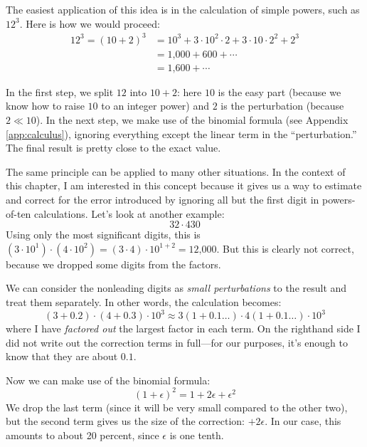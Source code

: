 The easiest application of this idea is in the calculation of simple
powers, such as $12^3$. Here is how we would proceed:
\begin{align*}
12^3 = (10+2)^3 & = 10^3 + 3 \cdot 10^2 \cdot 2 
                         + 3 \cdot 10 \cdot 2^2 + 2^3 \\
                & = \text{1,000} + 600 + \dotsb \\
                & = \text{1,600} + \dotsb
\end{align*}
    
In the first step, we split $12$ into $10 + 2$: here $10$ is the easy
part (because we know how to raise $10$ to an integer power) and $2$
is the perturbation (because $2 \ll 10$).  In the next step, we make
use of the binomial formula (see Appendix \ref{app:calculus}),
ignoring everything except the linear term in the ``perturbation.''
The final result is pretty close to the exact value.
    
The same principle can be applied to many other situations.  In the
context of this chapter, I am interested in this concept because  it
gives us a way to estimate and correct for the error introduced by
ignoring all but the first digit in powers-of-ten calculations.  Let's
look at another example:
%
\[
32 \cdot 430
\]
%
Using only the most significant digits, this is $(3 \cdot 10^1) \cdot
(4 \cdot 10^2) = (3 \cdot 4) \cdot 10^{1 + 2} = \text{12,000}$. But
this is clearly not correct, because we dropped some digits from the
factors.

We can consider the nonleading digits as \emph{small perturbations} to
the result and treat them separately. In other words, the calculation
becomes:
% 
\[ (3 + 0.2) \cdot (4 + 0.3) \cdot 10^3 
\approx 3 (1 + 0.1\dotsc) \cdot 4 (1+0.1\dotsc) \cdot 10^3 
\] 
% 
where I have \emph{factored out} the largest factor in each term. On
the righthand side I did not write out the correction terms in
full---for our purposes, it's enough to know that they are about $0.1$.
    
    
Now we can make use of the binomial formula:
%
\[
(1 + \epsilon)^2 = 1 + 2 \epsilon + \epsilon^2
\]
%
We drop the last term (since it will be very small compared to the
other two), but the second term gives us the size of the correction:
$+ 2 \epsilon$. In our case, this amounts to about 20 percent, since
$\epsilon$ is one tenth.
    
